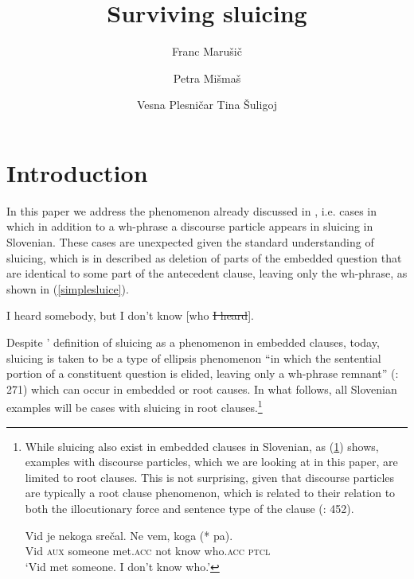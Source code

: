 \documentclass[output=paper,
modfonts,
newtxmath,
hidelinks
]{langscibook}
\title{Surviving sluicing}
\author{
Franc Marušič\affiliation{University of Nova Gorica}\and 
Petra Mišmaš\affiliation{University of Nova Gorica}\and
Vesna Plesničar\affiliation{University of Nova Gorica}\lastand
Tina Šuligoj\affiliation{University of Nova Gorica}
}
\begin{document}
\maketitle
{}

\section{Introduction}\label{s1}
In this paper we address the phenomenon already discussed in \cite{marusicetal2015}, i.e. cases in which in addition to a wh-phrase a discourse particle appears in sluicing in Slovenian. These cases are unexpected given the standard understanding of sluicing, which is in \cite{ross1969} described as deletion of parts of the embedded question that are identical to some part of the antecedent clause, leaving only the wh-phrase, as shown in (\ref{simplesluice}). 


\ea \label{simplesluice}I heard somebody, but I don't know [who \sout{I heard}].
\z
 
\noindent Despite \citeauthor{ross1969}' definition of sluicing as a phenomenon in embedded clauses, today, sluicing is taken to be a type of ellipsis phenomenon ``in which the sentential portion of a constituent question is elided, leaving only a wh-phrase remnant'' (\citealt{merchant2006}: 271) which can occur in embedded or root causes. In what follows, all Slovenian examples will be cases with sluicing in root clauses.\footnote{While sluicing also exist in embedded clauses in Slovenian, as (\ref{embeddedpa}) shows, examples with discourse particles, which we are looking at in this paper, are limited to root clauses. This is not surprising, given that discourse particles are typically a root clause phenomenon, which is related to their relation to both the illocutionary force and sentence type of the clause (\citealt{bayerobenauer2011}: 452).

\ea \label{embeddedpa}
\gll Vid je nekoga srečal. Ne vem, koga (*\hspace{-2pt} pa).\\
Vid \textsc{aux}  someone met.\textsc{acc}  not know who.\textsc{acc} {} \textsc{ptcl}\\
\glt `Vid met someone. I don't know who.'
\zlast }
\end{document}
